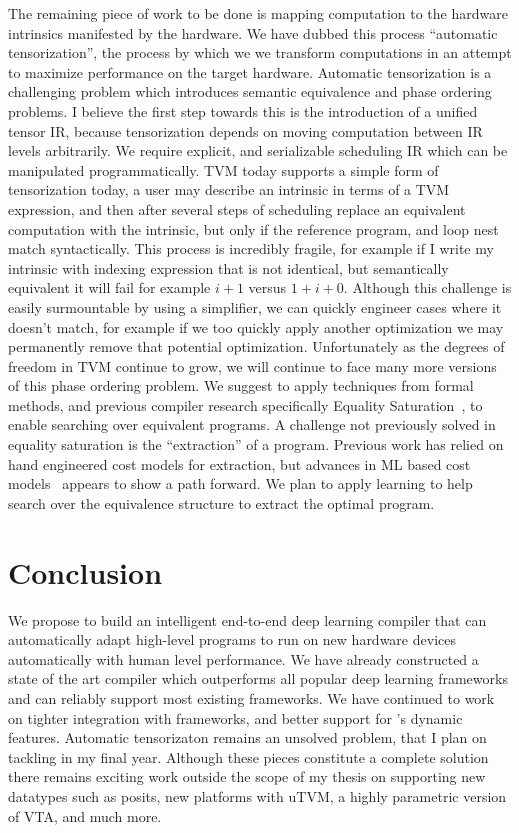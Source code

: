 The remaining piece of work to be done is mapping
    computation to the hardware intrinsics manifested by the hardware.
We have dubbed this process ``automatic tensorization'', the process by which we
    we transform computations in an attempt to maximize performance on the target
    hardware.
Automatic tensorization is a challenging problem which introduces
    semantic equivalence and phase ordering problems.
I believe the first step towards this is the introduction of a unified
    tensor IR, because tensorization depends on moving computation between
    IR levels arbitrarily.
We require explicit, and serializable scheduling IR which can be manipulated
    programmatically.
TVM today supports a simple form of tensorization today, a user may describe
    an intrinsic in terms of a TVM expression, and then after several steps
    of scheduling replace an equivalent computation with the intrinsic,
    but only if the reference program, and loop nest match syntactically.
This process is incredibly fragile, for example if I write my intrinsic with
    indexing expression that is not identical, but semantically equivalent
    it will fail for example $i + 1$ versus $1 + i + 0$.
Although this challenge is easily surmountable by using a simplifier,
    we can quickly engineer cases where it doesn't match, for example
    if we too quickly apply another optimization we may permanently
    remove that potential optimization.
Unfortunately as the degrees of freedom in TVM continue to grow, we
    will continue to face many more versions of this phase ordering
    problem.
We suggest to apply techniques from formal methods, and previous compiler
    research specifically Equality Saturation~\citep{eqsat}, to enable searching
    over equivalent programs.
A challenge not previously solved in equality saturation is the ``extraction''
    of a program.
Previous work has relied on hand engineered cost models for extraction, but
    advances in ML based cost models~\citep{autotvm} appears to show a path
    forward.
We plan to apply learning to help search over the equivalence structure to
    extract the optimal program.

    \section{Conclusion}
\label{sec:conclusion}

We propose to build an intelligent end-to-end deep learning compiler that can
automatically adapt high-level programs to run on new hardware devices automatically
with human level performance. We have already constructed a state of the art compiler
which outperforms all popular deep learning frameworks and can reliably support most
existing frameworks. We have continued to work on tighter integration with frameworks,
and better support for \relay's dynamic features. Automatic tensorizaton remains an unsolved
problem, that I plan on tackling in my final year. Although these pieces constitute a
complete solution there remains exciting work outside the scope of my thesis on
supporting new datatypes such as posits, new platforms with uTVM, a highly
parametric version of VTA, and much more.

